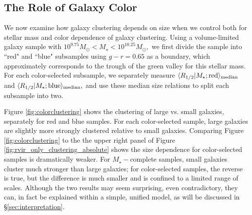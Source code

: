 \documentclass[usenatbib,usegraphicx,letterpaper]{mn2e}
\newcommand{\rhalf}{R_{1/2}}
\newcommand{\mstar}{M_{\star}}
\newcommand{\median}[2]{\langle{#1}\vert{#2}\rangle_{\rm median}}
\newcommand{\msun}{M_\odot}
\begin{document}
\subsection{The Role of Galaxy Color}
\label{subsec:colormorph}

We now examine how galaxy clustering depends on size when we control both for stellar mass and color dependence of galaxy clustering. Using a volume-limited galaxy sample with $10^{9.75}\msun < \mstar< 10^{10.25}\msun,$ we first divide the sample into ``red" and ``blue" subsamples using $g-r=0.65$ as a boundary, which approximately corresponds to the trough of the green valley for this stellar mass. For each color-selected subsample, we separately measure $\median{\rhalf}{\mstar; {\rm red}}$ and $\median{\rhalf}{\mstar; {\rm blue}},$ and use these median size relations to split each subsample into two.

Figure \ref{fig:colorclustering} shows the clustering of large vs. small galaxies, separately for red and blue samples. For each color-selected sample, large galaxies are slightly more strongly clustered relative to small galaxies. Comparing Figure \ref{fig:colorclustering} to the the upper right panel of Figure \ref{fig:rvir_only_clustering_absolute} shows the size dependence for color-selected samples is dramatically weaker.   For $\mstar-$complete samples, small galaxies cluster much stronger than large galaxies; for color-selected samples, the reverse is true, but the difference is much smaller and is confined to a limited range of scales.  Although the two results may seem surprising, even contradictory, they can, in fact be explained within a simple, unified model, as will be discussed in \S\ref{sec:interpretation}.
\end{document}
